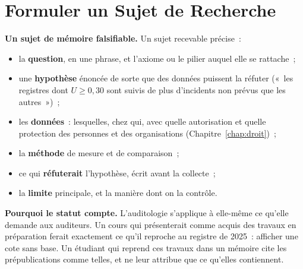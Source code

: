 \section{Formuler un Sujet de Recherche}
\label{sec:c16-sujet}

\begin{boxprocedure}
\textbf{Un sujet de mémoire falsifiable.} Un sujet recevable précise~:
\begin{itemize}
    \item la \textbf{question}, en une phrase, et l'axiome ou le pilier
          auquel elle se rattache~;
    \item une \textbf{hypothèse} énoncée de sorte que des données puissent
          la réfuter («~les registres dont $U \geq 0{,}30$ sont suivis de
          plus d'incidents non prévus que les autres~»)~;
    \item les \textbf{données}~: lesquelles, chez qui, avec quelle
          autorisation et quelle protection des personnes et des
          organisations (Chapitre~\ref{chap:droit})~;
    \item la \textbf{méthode} de mesure et de comparaison~;
    \item ce qui \textbf{réfuterait} l'hypothèse, écrit avant la collecte~;
    \item la \textbf{limite} principale, et la manière dont on la contrôle.
\end{itemize}
\end{boxprocedure}

\begin{boxinfo}
\textbf{Pourquoi le statut compte.} L'auditologie s'applique à elle-même ce
qu'elle demande aux auditeurs. Un cours qui présenterait comme acquis des
travaux en préparation ferait exactement ce qu'il reproche au registre de
2025~: afficher une cote sans base. Un étudiant qui reprend ces travaux
dans un mémoire cite les prépublications comme telles, et ne leur attribue
que ce qu'elles contiennent.
\end{boxinfo}

\separateur

